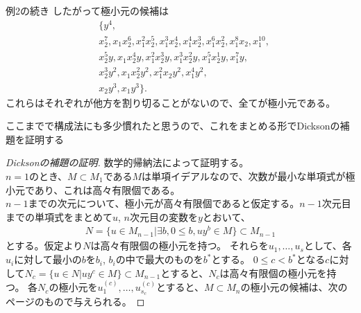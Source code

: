 \begin{frame}
	\begin{exampleblock} {例2の続き}
		したがって極小元の候補は
		\begin{align*}
			 & \{y^4,                                                                               \\
			 & x_2^7, x_1x_2^6, x_1^2x_2^5, x_1^3x_2^4, x_1^4x_2^3, x_1^6x_2^2, x_1^8x_2, x_1^{10}, \\
			 & x_2^5y, x_1x_2^4y, x_1^2x_2^3 y,x_1^3x_2^2y, x_1^5x_2^1y, x_1^7y,                    \\
			 & x_2^3y^2, x_1x_2^2y^2, x_1^2x_2y^2, x_1^4y^2,                                        \\
			 & x_2 y^3, x_1y^3\}.
		\end{align*}
		これらはそれぞれが他方を割り切ることがないので、全てが極小元である。
	\end{exampleblock}
\end{frame}

\begin{frame}
	ここまでで構成法にも多少慣れたと思うので、これをまとめる形でDicksonの補題を証明する
	\begin{proof} [Dicksonの補題の証明]
		数学的帰納法によって証明する。\\
		$n=1$のとき、$M \subset M_1$である$M$は単項イデアルなので、次数が最小な単項式が極小元であり、これは高々有限個である。\\
		$n-1$までの次元について、極小元が高々有限個であると仮定する。$n-1$次元目までの単項式をまとめて$u$, $n$次元目の変数を$y$とおいて、
		\begin{align*}
			N = \{u \in M_{n-1} | \exists b, 0 \leq b, uy^b \in M\} \subset M_{n-1}
		\end{align*}
		とする。仮定より$N$は高々有限個の極小元を持つ。
		それらを$u_1, \ldots, u_s$として、各$u_i$に対して最小の$b$を$b_i$, $b_i$の中で最大のものを$b^*$とする。
		$0 \leq c < b^*$となる$c$に対して$N_c = \{u \in N | uy^c \in M\} \subset M_{n-1}$とすると、$N_c$は高々有限個の極小元を持つ。
		各$N_c$の極小元を$u_1^{(c)}, \ldots, u_{s_c}^{(c)}$とすると、$M \subset M_n$の極小元の候補は、次のページのもので与えられる。
		\let\qedsymbol\relax
	\end{proof}
\end{frame}

